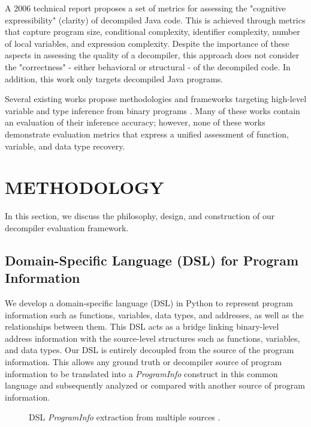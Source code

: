 \documentclass[a4paper,twoside]{article}
\begin{document}
A 2006 technical report \cite{bib:metrics-effectiveness-decompilers} proposes a set of metrics for assessing the "cognitive expressibility" (clarity) of decompiled Java code. This is achieved through metrics that capture program size, conditional complexity, identifier complexity, number of local variables, and expression complexity. Despite the importance of these aspects in assessing the quality of a decompiler, this approach does not consider the "correctness" - either behavioral or structural - of the decompiled code. In addition, this work only targets decompiled Java programs.

Several existing works propose methodologies and frameworks targeting high-level variable and type inference from binary programs \cite{bib:divine,bib:tie,bib:artiste,bib:rewards,bib:scalable-variable-datatype-detection,bib:retypd}. Many of these works contain an evaluation of their inference accuracy; however, none of these works demonstrate evaluation metrics that express a unified assessment of function, variable, and data type recovery.

\section{\uppercase{Methodology}} \label{sec:methodology}

In this section, we discuss the philosophy, design, and construction of our decompiler evaluation framework.

\subsection{Domain-Specific Language (DSL) for Program Information}

We develop a domain-specific language (DSL) in Python to represent program information such as functions, variables, data types, and addresses, as well as the relationships between them. This DSL acts as a bridge linking binary-level address information with the source-level structures such as functions, variables, and data types. Our DSL is entirely decoupled from the source of the program information. This allows any ground truth or decompiler source of program information to be translated into a \emph{ProgramInfo} construct in this common language and subsequently analyzed or compared with another source of program information.

\begin{figure}[htb]
    \centering
    \scalebox{0.4}{
        
    }
    \caption{DSL \emph{ProgramInfo} extraction from multiple sources \cite{bib:ghidra,bib:ida,bib:jeb}.}
    \label{fig:proginfo-sources}
\end{figure}
\end{document}
